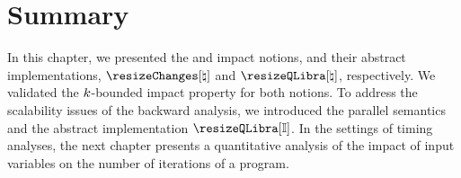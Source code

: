 \section{Summary}

In this chapter, we presented the \changesname{} and \qlibraname{} impact notions, and their abstract implementations, $\abstractchangesname$ and $\abstractqlibraname$, respectively.
We validated the $k$-bounded impact property for both notions.
To address the scalability issues of the backward analysis, we introduced the parallel semantics and the abstract implementation $\parallelqlibraname$.
In the settings of timing analyses, the next chapter presents a quantitative analysis of the impact of input variables on the number of iterations of a program.
